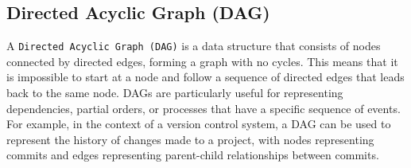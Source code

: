\subsection{Directed Acyclic Graph (DAG)}

A \lstinline{Directed Acyclic Graph (DAG)} is a data structure that consists of nodes connected by directed edges, forming a graph with no cycles. This means that it is impossible to start at a node and follow a sequence of directed edges that leads back to the same node. DAGs are particularly useful for representing dependencies, partial orders, or processes that have a specific sequence of events. For example, in the context of a version control system, a DAG can be used to represent the history of changes made to a project, with nodes representing commits and edges representing parent-child relationships between commits\cite{surti_2016}.



